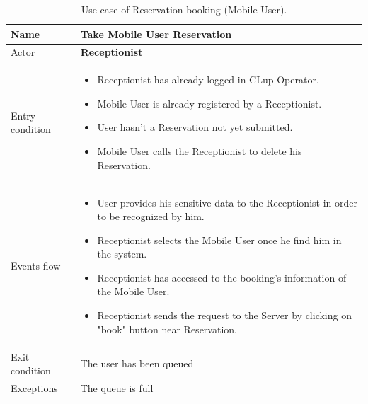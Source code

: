 \begin{table}[H]\begin{tabular}{|p{5cm} | p{7cm} | }
	\hline
	Name & \textbf{Take Mobile User Reservation} \\
	\hline
	Actor & \textbf{Receptionist} \\
	\hline
	Entry condition &
	\begin{itemize}
		\item Receptionist has already logged in CLup Operator. 
 		\item Mobile User is already registered by a Receptionist.
		\item User hasn't a Reservation not yet submitted. 
        \item Mobile User calls the Receptionist to delete his Reservation.
	\end{itemize} \\
	\hline
	Events flow & 
	\begin{itemize}
        \item User provides his sensitive data to the Receptionist in order to be recognized by him. 
        \item Receptionist selects the Mobile User once he find him in the system.
		\item Receptionist has accessed to the booking's information of the Mobile User.
        \item Receptionist sends the request to the Server by clicking on "book" button near Reservation.
	\end{itemize} \\
	\hline
	Exit condition &
	The user has been queued \\
	\hline 
	Exceptions & 
	The queue is full \\
	\hline
\end{tabular}
\caption{Use case of Reservation booking (Mobile User).}

\end{table}
\bigbreak

